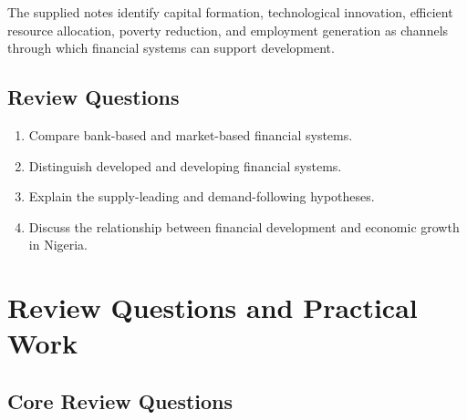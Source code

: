 \documentclass[
]{article}
\providecommand{\tightlist}{%
  \setlength{\itemsep}{0pt}\setlength{\parskip}{0pt}}
\begin{document}
The supplied notes identify capital formation, technological innovation, efficient resource allocation, poverty reduction, and employment generation as channels through which financial systems can support development.

\subsection{Review Questions}\label{review-questions-7}

\begin{enumerate}
\def\labelenumi{\arabic{enumi}.}
\tightlist
\item
  Compare bank-based and market-based financial systems.
\item
  Distinguish developed and developing financial systems.
\item
  Explain the supply-leading and demand-following hypotheses.
\item
  Discuss the relationship between financial development and economic growth in Nigeria.
\end{enumerate}

\section{Review Questions and Practical Work}\label{review-questions-and-practical-work}

\subsection{Core Review Questions}\label{core-review-questions}
\end{document}
